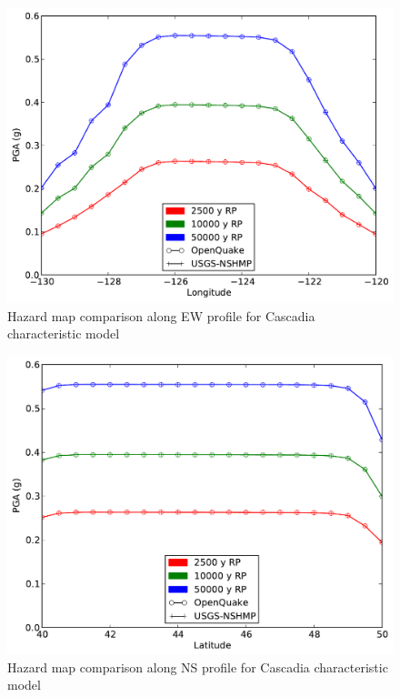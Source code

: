 %
\begin{figure}
\centering
\includegraphics[width=12.5cm]{./qareport/pictures/cascadia_char_oq_nshmp_ew.pdf}
\caption{Hazard map comparison along EW profile for Cascadia characteristic model}
\label{fig:cascadia_char_ew}
\end{figure}
\begin{figure}
\centering
\includegraphics[width=12.5cm]{./qareport/pictures/cascadia_char_oq_nshmp_ns.pdf}
\caption{Hazard map comparison along NS profile for Cascadia characteristic model}
\label{fig:cascadia_char_ns}
\end{figure}
%

